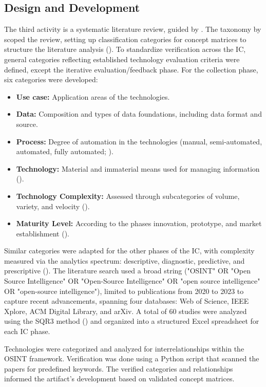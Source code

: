 \documentclass[10pt]{article}
\begin{document}
\subsection{Design and Development}
The third activity is a systematic literature review, guided by \textcite{Cleven.2009}.  The taxonomy by \cite{Cooper.1988} scoped the review, setting up classification categories for concept matrices to structure the literature analysis (\cite{Webster.2002}).
To standardize verification across the IC, general categories reflecting established technology evaluation criteria were defined, except the iterative evaluation/feedback phase. For the collection phase, six categories were developed:
\begin{itemize}
    \item \textbf{Use case:} Application areas of the technologies.
    \item \textbf{Data:} Composition and types of data foundations, including data format and source.
    \item \textbf{Process:} Degree of automation in the technologies (manual, semi-automated, automated, fully automated; \cite{Duncheon.2002, Billings.1997, Endsley.1999}).
    \item \textbf{Technology:} Material and immaterial means used for managing information (\cite{Bleck.2004}).
    \item \textbf{Technology Complexity:} Assessed through subcategories of volume, variety, and velocity (\cite{Elgendy.2014}).
    \item \textbf{Maturity Level:} According to the phases innovation, prototype, and  market establishment (\cite{Stich.2022}).
\end{itemize}

Similar categories were adapted for the other phases of the IC, with complexity measured via the analytics spectrum: descriptive, diagnostic, predictive, and prescriptive (\cite{Delen.2013}). The literature search used a broad string ("OSINT" OR "Open Source Intelligence" OR "Open-Source Intelligence" OR "open source intelligence" OR "open-source intelligence"), limited to publications from 2020 to 2023 to capture recent advancements, spanning four databases: Web of Science, IEEE Xplore, ACM Digital Library, and arXiv. A total of 60 studies were analyzed using the SQR3 method (\cite{Robinson.1970}) and organized into a structured Excel spreadsheet for each IC phase.

Technologies were categorized and analyzed for interrelationships within the OSINT framework. Verification was done using a Python script that scanned the papers for predefined keywords. The verified categories and relationships informed the artifact's development based on validated concept matrices.
\end{document}
